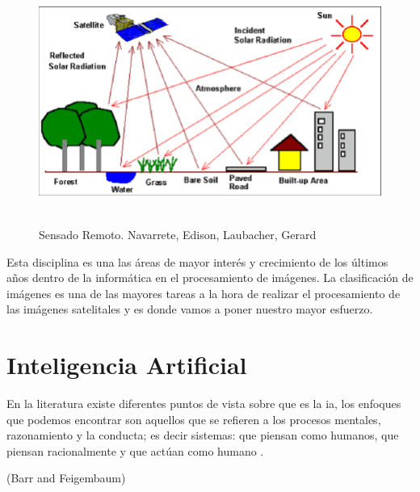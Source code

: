 \begin{figure}[H] \centering
  \includegraphics[height=8cm,keepaspectratio=true,clip=true]{imagenes/MarcoTeorico/teledeteccion.png}
  \caption{Sensado Remoto. Navarrete, Edison, Laubacher, Gerard}\label{Fig:teledeteccion}
\end{figure}

Esta disciplina es una las áreas de mayor interés y crecimiento de los últimos años dentro de la informática en el procesamiento de imágenes. La clasificación de imágenes es una de las mayores tareas a la hora de realizar el procesamiento de  las imágenes satelitales y es donde vamos a poner nuestro mayor esfuerzo.

\section{Inteligencia Artificial}\label{sec:inteligenciaA}

En la literatura existe diferentes puntos de vista sobre que es la \ac{ia}, los enfoques que podemos encontrar son aquellos que se refieren a los procesos mentales, razonamiento y la conducta; es decir sistemas: que piensan como humanos, que piensan racionalmente y que actúan como humano \citep{inteligenciaA}. 
\begin{center}
\begin{minipage}{0.8\linewidth}  
\begin{flushright}
  ({Barr and Feigembaum})
\end{flushright}
\vspace{5pt}
\end{minipage}
\end{center}

